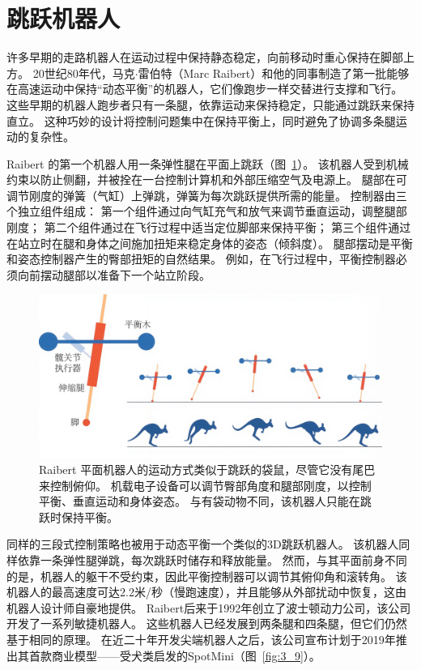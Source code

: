 \section{跳跃机器人}

许多早期的走路机器人在运动过程中保持静态稳定，向前移动时重心保持在脚部上方。
20世纪80年代，马克$\cdot$雷伯特（Marc Raibert）和他的同事制造了第一批能够在高速运动中保持“动态平衡”的机器人，它们像跑步一样交替进行支撑和飞行。
这些早期的机器人跑步者只有一条腿，依靠运动来保持稳定，只能通过跳跃来保持直立。
这种巧妙的设计将控制问题集中在保持平衡上，同时避免了协调多条腿运动的复杂性。


Raibert 的第一个机器人用一条弹性腿在平面上跳跃（图~\ref{fig:3_8}）。
该机器人受到机械约束以防止侧翻，并被拴在一台控制计算机和外部压缩空气及电源上。
腿部在可调节刚度的弹簧（气缸）上弹跳，弹簧为每次跳跃提供所需的能量。
控制器由三个独立组件组成：
第一个组件通过向气缸充气和放气来调节垂直运动，调整腿部刚度；
第二个组件通过在飞行过程中适当定位脚部来保持平衡；
第三个组件通过在站立时在腿和身体之间施加扭矩来稳定身体的姿态（倾斜度）。
腿部摆动是平衡和姿态控制器产生的臀部扭矩的自然结果。
例如，在飞行过程中，平衡控制器必须向前摆动腿部以准备下一个站立阶段。

\begin{figure}[!htb]
	\centering
	\includegraphics[width=1.0\linewidth]{chap3/3_8}
	\caption{Raibert 平面机器人的运动方式类似于跳跃的袋鼠，尽管它没有尾巴来控制俯仰。
		机载电子设备可以调节臀部角度和腿部刚度，以控制平衡、垂直运动和身体姿态。
		与有袋动物不同，该机器人只能在跳跃时保持平衡\cite{raibert1984machines}。 \label{fig:3_8}}
\end{figure}

同样的三段式控制策略也被用于动态平衡一个类似的3D跳跃机器人\cite{raibert1984machines}。
该机器人同样依靠一条弹性腿弹跳，每次跳跃时储存和释放能量。
然而，与其平面前身不同的是，机器人的躯干不受约束，因此平衡控制器可以调节其俯仰角和滚转角。
该机器人的最高速度可达2.2米/秒（慢跑速度），并且能够从外部扰动中恢复，这由机器人设计师自豪地提供。
Raibert后来于1992年创立了波士顿动力公司，该公司开发了一系列敏捷机器人。
这些机器人已经发展到两条腿和四条腿，但它们仍然基于相同的原理。
在近二十年开发尖端机器人之后，该公司宣布计划于2019年推出其首款商业模型——受犬类启发的SpotMini（图~\ref{fig:3_9}）。


